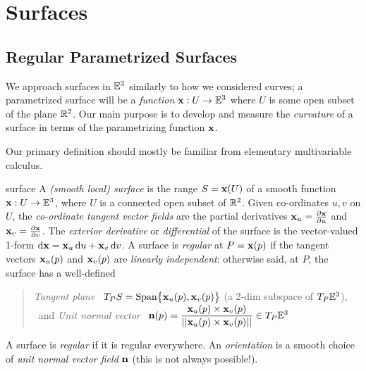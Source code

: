 \graphicspath{{surfaces/asy/}}

\section{Surfaces}

\subsection{Regular Parametrized Surfaces}\label{sec:regularsurfaces}

We approach surfaces in $\E^3$ similarly to how we considered curves; a parametrized surface will be a \emph{function} $\vx:U\to\E^3$ where $U$ is some open subset of the plane $\R^2$. Our main purpose is to develop and measure the \emph{curvature} of a surface in terms of the parametrizing function $\vx$.\medbreak


Our primary definition should mostly be familiar from elementary multivariable calculus.

\begin{defn}{}{surface}
A \emph{(smooth local) surface\footnotemark} is the range $S=\vx(U)$ of a smooth function $\vx:U\to\E^3$, where $U$ is a connected open subset of $\R^2$.\smallbreak
Given co-ordinates $u,v$ on $U$, the \emph{co-ordinate tangent vector fields} are the partial derivatives $\vx_u=\partials[\vx]{u}$ and $\vx_v=\partials[\vx]{v}$.\smallbreak
The \emph{exterior derivative} or \emph{differential} of the surface is the vector-valued 1-form $\dvx=\vx_u\,\du+\vx_v\,\dv$.\smallbreak
A surface is \emph{regular} at $P=\vx(p)$ if the tangent vectors $\vx_u(p)$ and $\vx_v(p)$ are \emph{linearly independent}: otherwise said, at $P$, the surface has a well-defined
\begin{quote}
	\emph{Tangent plane} \ $T_PS=\Span\bigl\{\vx_u(p),\vx_v(p)\bigr\}$ (a 2-dim subspace of $T_P\E^3$), \ and \smallbreak
	\emph{Unit normal vector} \ $\vn(p)=\dfrac{\vx_u(p)\times\vx_v(p)}{\Nm{\vx_u(p)\times\vx_v(p)}} \in T_P\E^3$
\end{quote}
A surface is \emph{regular} if it is regular everywhere. An \emph{orientation} is a smooth choice of \emph{unit normal vector field} $\vn$ (this is not always possible!).
\end{defn}




